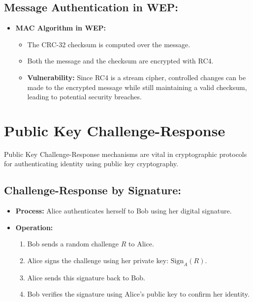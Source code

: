 \documentclass[12pt]{article}
\begin{document}
\subsection*{Message Authentication in WEP:}
\begin{itemize}
    \item \textbf{MAC Algorithm in WEP:}
    \begin{itemize}
        \item The CRC-32 checksum is computed over the message.
        \item Both the message and the checksum are encrypted with RC4.
        \item \textbf{Vulnerability:} Since RC4 is a stream cipher, controlled changes can be made to the encrypted message while still maintaining a valid checksum, leading to potential security breaches.
    \end{itemize}
\end{itemize}

\section*{Public Key Challenge-Response}

Public Key Challenge-Response mechanisms are vital in cryptographic protocols for authenticating identity using public key cryptography.

\subsection*{Challenge-Response by Signature:}
\begin{itemize}
    \item \textbf{Process:} Alice authenticates herself to Bob using her digital signature.
    \item \textbf{Operation:}
    \begin{enumerate}
        \item Bob sends a random challenge \( R \) to Alice.
        \item Alice signs the challenge using her private key: \( \text{Sign}_A(R) \).
        \item Alice sends this signature back to Bob.
        \item Bob verifies the signature using Alice's public key to confirm her identity.
    \end{enumerate}
\end{itemize}
\end{document}
